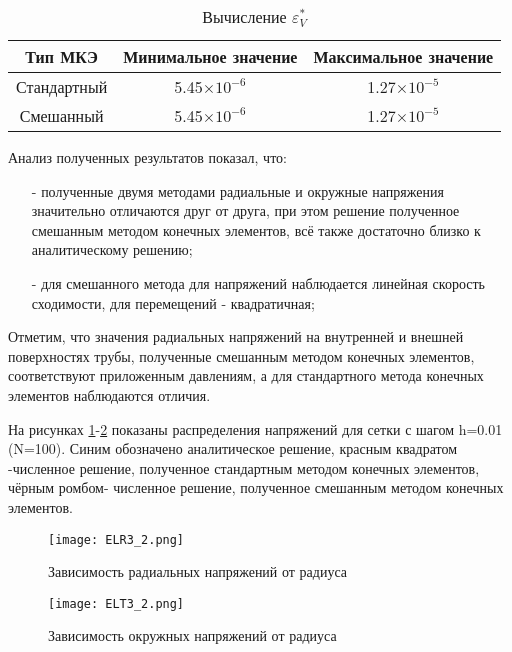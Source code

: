\documentclass[a4paper,14pt]{extarticle}
\begin{document}
\begin{spacing}{1.0}
\newpage

\begin{table}
\caption{Вычисление $\varepsilon^{*}_V$}
\label{tabl:EpsV3}
\begin{center}
\begin{tabular}{|c|c|c|}
\hline
Тип МКЭ & Минимальное значение & Максимальное значение \\
\hline
Стандартный & 5.45$\times 10^{-6}$ & 1.27$\times 10^{-5}$ \\
\hline
Смешанный &  5.45$\times 10^{-6}$ &  1.27$\times 10^{-5}$ \\
\hline
\end{tabular}
\end{center}
\end{table}
 
\end{spacing}

Анализ полученных результатов показал, что:
\begin{itemize}
\item[-]полученные двумя методами радиальные и окружные напряжения значительно отличаются друг от друга, при этом решение полученное смешанным методом конечных элементов, всё также достаточно близко к аналитическому решению;
\item[-]для смешанного метода для напряжений наблюдается линейная скорость сходимости, для перемещений - квадратичная;
\end{itemize}

Отметим, что значения радиальных напряжений на внутренней и внешней поверхностях трубы, полученные смешанным методом конечных элементов, соответствуют приложенным давлениям, а для стандартного метода конечных элементов наблюдаются отличия.  

На рисунках \ref{3r}-\ref{3t} показаны распределения напряжений для сетки с шагом h=0.01 (N=100). Синим обозначено аналитическое решение, красным квадратом -численное решение, полученное стандартным методом конечных элементов, чёрным ромбом- численное решение, полученное смешанным методом конечных элементов. 

\newpage
\begin{figure}[h]
\begin{center}
\texttt{[image: ELR3\_2.png]}
\caption{Зависимость радиальных напряжений от радиуса}
\label{3r}
\end{center}
\end{figure}

\begin{figure}[h]
\begin{center}
\texttt{[image: ELT3\_2.png]}
\caption{Зависимость окружных напряжений от радиуса}
\label{3t}
\end{center}
\end{figure}
\end{document}
